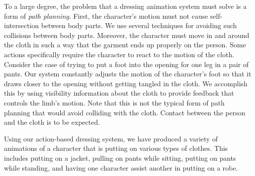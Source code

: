 To a large degree, the problem that a dressing animation system must solve
is a form of \emph{path planning}.  First, the character's motion must not
cause self-intersection between body parts.  We use several techniques
for avoiding such collisions between body parts.  Moreover, the character
must move in and around the cloth in such a way that the garment ends up
properly on the person.  Some actions specifically require the character
to react to the motion of the cloth.  Consider the case of trying to put a
foot into the opening for one leg in a pair of pants.  Our system
constantly adjusts the motion of the character's foot so that it draws
closer to the opening without getting tangled in the cloth.  We accomplish
this by using visibility information about the cloth to provide feedback
that controls the limb's motion.  Note that this is not the typical form
of path planning that would avoid colliding with the cloth.  Contact
between the person and the cloth is to be expected.

Using our action-based dressing system, we have produced a variety of
animations of a character that is putting on various types of clothes.
This includes putting on a jacket, pulling on pants while sitting, putting
on pants while standing, and having one character assist another in
putting on a robe.


